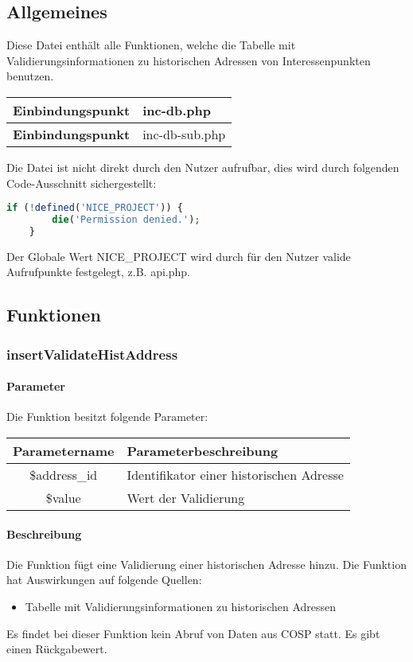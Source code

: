 \subsection{Allgemeines} Diese Datei enthält alle Funktionen, welche die Tabelle mit Validierungsinformationen zu historischen Adressen von Interessenpunkten benutzen.
\begin{table}[H]
	\begin{tabular}{|c|p{11cm}|}
		\hline
		\textbf{Einbindungspunkt} & inc-db.php \\ \hline
		\textbf{Einbindungspunkt} & inc-db-sub.php \\ \hline
	\end{tabular}
\end{table}
Die Datei ist nicht direkt durch den Nutzer aufrufbar, dies wird durch folgenden Code-Ausschnitt sichergestellt:
\begin{lstlisting}[language=php]
	if (!defined('NICE_PROJECT')) {
		die('Permission denied.');
	}
\end{lstlisting}
Der Globale Wert {\glqq NICE\_PROJECT\grqq} wird durch für den Nutzer valide Aufrufpunkte festgelegt, z.B. {\glqq api.php\grqq}.
\newpage
\subsection{Funktionen}
\subsubsection{insertValidateHistAddress}
\paragraph{Parameter} Die Funktion besitzt folgende Parameter:
\begin{table}[H]
	\begin{tabular}{|c|p{11cm}|}
		\hline
		\textbf{Parametername} & \textbf{Parameterbeschreibung} \\ \hline
		\$address\_id & Identifikator einer historischen Adresse \\ \hline
		\$value       & Wert der Validierung \\ \hline
	\end{tabular}
\end{table}
\paragraph{Beschreibung} Die Funktion fügt eine Validierung einer historischen Adresse hinzu. Die Funktion hat Auswirkungen auf folgende Quellen:
\begin{itemize}
	\item Tabelle mit Validierungsinformationen zu historischen Adressen
\end{itemize}
Es findet bei dieser Funktion kein Abruf von Daten aus {\glqq COSP\grqq} statt. Es gibt einen Rückgabewert.
